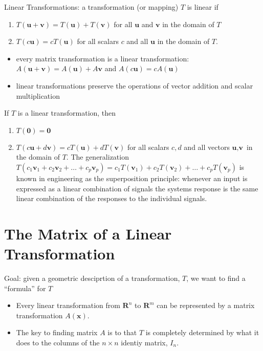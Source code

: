 \documentclass[../linalg.tex]{subfiles}
\begin{document}
Linear Transformations: a transformation (or mapping) $T$ is linear if 
\begin{enumerate}
    \item $T(\textbf{u}+\textbf{v}) = T(\textbf{u})+T(\textbf{v})$ for all $\textbf{u}$ and $\textbf{v}$ in the domain of $T$
    \item $T(c\textbf{u})=cT(\textbf{u})$ for all scalars $c$ and all $\textbf{u}$ in the domain of $T$.
\end{enumerate}
\begin{itemize}
    \item every matrix transformation is a linear transformation: $A(\textbf{u}+\textbf{v})=A(\textbf{u})+A\textbf{v}$ and $A(c\textbf{u})=cA(\textbf{u})$
    \item linear transformations preserve the operations of vector addition and scalar multiplication
\end{itemize}

If $T$ is a linear transformation, then 
\begin{enumerate}
    \item $T(\textbf{0})=\textbf{0}$
    \item $T(c\textbf{u}+d\textbf{v})=cT(\textbf{u})+dT(\textbf{v})$ for all scalars $c,d$ and all vectors $\textbf{u},\textbf{v}$ in the domain of $T$. The generalization $T(c_1\textbf{v}_1+c_2\textbf{v}_2+\dots+c_p\textbf{v}_p)=c_1T(\textbf{v}_1)+c_2T(\textbf{v}_2)+\dots+c_pT(\textbf{v}_p)$ is known in engineering as the superposition principle: whenever an input is expressed as a linear combination of signals the systems response is the same linear combination of the responses to the individual signals.
\end{enumerate}





\section{The Matrix of a Linear Transformation}
Goal: given a geometric desciprtion of a transformation, $T$, we want to find a ``formula'' for $T$
\begin{itemize}
    \item Every linear transformation from $\textbf{R}^n$ to $\textbf{R}^m$ can be represented by a matrix transformation $A(\textbf{x})$.
    \item The key to finding matrix $A$ is to that $T$ is completely determined by what it does to the columns of the $n\times n$ identiy matrix, $I_n$.
\end{itemize}
\end{document}
